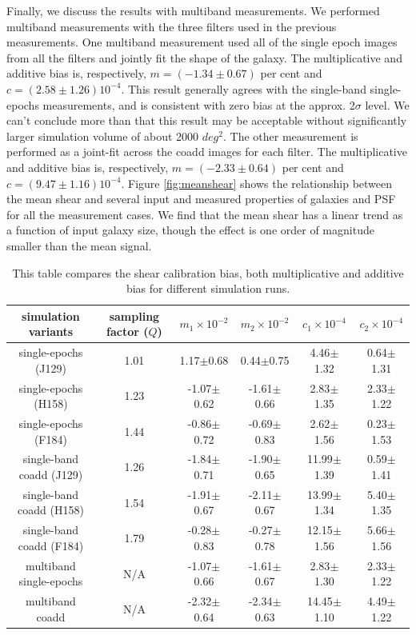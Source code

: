 \documentclass[fleqn,usenatbib]{mnras}
\begin{document}
Finally, we discuss the results with multiband measurements. We performed multiband measurements with the three filters used in the previous measurements. One multiband measurement used all of the single epoch images from all the filters and jointly fit the shape of the galaxy. The multiplicative and additive bias is, respectively, $m=(-1.34\pm0.67)$ per cent and $c=(2.58\pm1.26)10^{-4}$. This result generally agrees with the single-band single-epochs measurements, and is consistent with zero bias at the approx. 2$\sigma$ level. We can't conclude more than that this result may be acceptable without significantly larger simulation volume of about 2000 $deg^{2}$. The other measurement is performed as a joint-fit across the coadd images for each filter. The multiplicative and additive bias is, respectively, $m=(-2.33\pm0.64)$ per cent and $c=(9.47\pm1.16)10^{-4}$. Figure \ref{fig:meanshear} shows the relationship between the mean shear and several input and measured properties of galaxies and PSF for all the measurement cases. We find that the mean shear has a linear trend as a function of input galaxy size, though the effect is one order of magnitude smaller than the mean signal.


\begin{table}
	\centering
	\label{tab:bias_summary}
	\begin{tabular}[scale=1.4]{ c|c|c|c|c|c } 
		\hline
		simulation variants & sampling factor ($Q$) & $m_{1}\times10^{-2}$ & $m_{2}\times10^{-2}$ & $c_{1}\times10^{-4}$ & $c_{2}\times10^{-4}$\\
		\hline
		single-epochs (J129) & 1.01 & 1.17$\pm$0.68 & 0.44$\pm$0.75 & 4.46$\pm$1.32 & 0.64$\pm$1.31\\
		single-epochs (H158) & 1.23 & -1.07$\pm$0.62 & -1.61$\pm$0.66 & 2.83$\pm$1.35 & 2.33$\pm$1.22\\
		single-epochs (F184) & 1.44 & -0.86$\pm$0.72 & -0.69$\pm$0.83 & 2.62$\pm$1.56 & 0.23$\pm$1.53\\
		\hline
		single-band coadd (J129) & 1.26 & -1.84$\pm$0.71 & -1.90$\pm$0.65 & 11.99$\pm$1.39 & 0.59$\pm$1.41\\
		single-band coadd (H158) & 1.54 & -1.91$\pm$0.67 & -2.11$\pm$0.67 & 13.99$\pm$1.34 & 5.40$\pm$1.35\\
		single-band coadd (F184) & 1.79 & -0.28$\pm$0.83 & -0.27$\pm$0.78 & 12.15$\pm$1.56 & 5.66$\pm$1.56\\
		\hline
		multiband single-epochs & N/A & -1.07$\pm$0.66 & -1.61$\pm$0.67 & 2.83$\pm$1.30 & 2.33$\pm$1.22 \\
		multiband coadd & N/A & -2.32$\pm$0.64 & -2.34$\pm$0.63 & 14.45$\pm$1.10 & 4.49$\pm$1.22\\
		
		\hline
	\end{tabular}
	\caption{This table compares the shear calibration bias, both multiplicative and additive bias for different simulation runs.}
	\label{tab:result}
\end{table}
\end{document}
